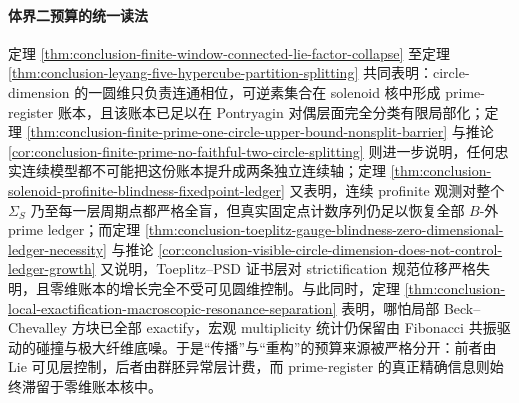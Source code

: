 \paragraph{体界二预算的统一读法}
定理 \ref{thm:conclusion-finite-window-connected-lie-factor-collapse} 至定理 \ref{thm:conclusion-leyang-five-hypercube-partition-splitting} 共同表明：circle-dimension 的一圆维只负责连通相位，可逆素集合在 solenoid 核中形成 prime-register 账本，且该账本已足以在 Pontryagin 对偶层面完全分类有限局部化；定理 \ref{thm:conclusion-finite-prime-one-circle-upper-bound-nonsplit-barrier} 与推论 \ref{cor:conclusion-finite-prime-no-faithful-two-circle-splitting} 则进一步说明，任何忠实连续模型都不可能把这份账本提升成两条独立连续轴；定理 \ref{thm:conclusion-solenoid-profinite-blindness-fixedpoint-ledger} 又表明，连续 profinite 观测对整个 \(\Sigma_S\) 乃至每一层周期点都严格全盲，但真实固定点计数序列仍足以恢复全部 \(B\)-外 prime ledger；而定理 \ref{thm:conclusion-toeplitz-gauge-blindness-zero-dimensional-ledger-necessity} 与推论 \ref{cor:conclusion-visible-circle-dimension-does-not-control-ledger-growth} 又说明，Toeplitz--PSD 证书层对 strictification 规范位移严格失明，且零维账本的增长完全不受可见圆维控制。与此同时，定理 \ref{thm:conclusion-local-exactification-macroscopic-resonance-separation} 表明，哪怕局部 Beck--Chevalley 方块已全部 exactify，宏观 multiplicity 统计仍保留由 Fibonacci 共振驱动的碰撞与极大纤维底噪。于是“传播”与“重构”的预算来源被严格分开：前者由 Lie 可见层控制，后者由群胚异常层计费，而 prime-register 的真正精确信息则始终滞留于零维账本核中。

\endinput
